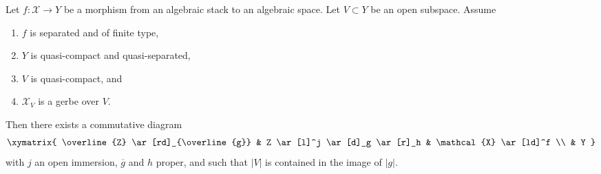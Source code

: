 %
\begin{lemma}
\label{lemma-make-section}
Let $f : \mathcal{X} \to Y$ be a morphism from an algebraic stack
to an algebraic space. Let $V \subset Y$ be an open subspace.
Assume
\begin{enumerate}
\item $f$ is separated and of finite type,
\item $Y$ is quasi-compact and quasi-separated,
\item $V$ is quasi-compact, and
\item $\mathcal{X}_V$ is a gerbe over $V$.
\end{enumerate}
Then there exists a commutative diagram
$$
\xymatrix{
\overline{Z} \ar[rd]_{\overline{g}} &
Z \ar[l]^j \ar[d]_g \ar[r]_h & \mathcal{X} \ar[ld]^f \\
& Y
}
$$
with $j$ an open immersion, $\overline{g}$ and $h$ proper,
and such that $|V|$ is contained in the image of $|g|$.
\end{lemma}

